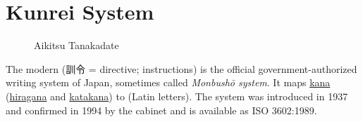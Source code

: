 \newpage
\section{Kunrei System}
\label{sec:Kunrei}
\label{sec:KunreiSystem}
\label{sec:JapanSystemLatinLetters}


\begin{figure}
        \caption{Aikitsu Tanakadate}
        \label{fig:AikitsuTanakadate}
\end{figure}

The modern  (訓令 = directive; instructions) is the official government-authorized
writing system of Japan, sometimes called \textit{Monbushō system}. It maps
\hyperref[sec:Kana]{kana} (\hyperref[sec:Hiragana]{hiragana} and
\hyperref[sec:Katakana]{katakana}) to 
(Latin letters). The system was introduced in 1937 and confirmed in 1994 by the
cabinet and is available as ISO 3602:1989.

